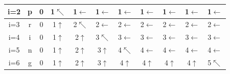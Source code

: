 \documentclass{article}
\begin{document}
\begin{multicols*}{2}
\begin{tabular}{|c|c|c|c|c|c|c|c|c|c|c|}
        i=2                           & p                             & 0                             & \cellcolor{red!25} 1$\nwarrow$ & 1$\leftarrow$
                                      & 1$\leftarrow$                 & 1$\leftarrow$                 &
        1$\leftarrow$                 & 1$\leftarrow$                 &
        1$\leftarrow$                 & 1$\leftarrow$                                                                                                       \\
        \hline
        i=3                           & r                             & 0                             & 1$\uparrow$                    & \cellcolor{red!25}
        2$\nwarrow$                   & 2$\leftarrow$                 & 2$\leftarrow$
                                      & 2$\leftarrow$                 & 2$\leftarrow$                 &
        2$\leftarrow$                 & 2$\leftarrow$                                                                                                       \\
        \hline
        i=4                           & i                             & 0                             & 1$\uparrow$                    & 2$\uparrow$
                                      & \cellcolor{red!25}3$\nwarrow$ & 3$\leftarrow$                 &
        3$\leftarrow$                 & 3$\leftarrow$                 &
        3$\leftarrow$                 & 3$\leftarrow$                                                                                                       \\
        \hline
        i=5                           & n                             & 0                             & 1$\uparrow$                    & 2$\uparrow$
                                      & 3$\uparrow$                   & \cellcolor{red!25}4$\nwarrow$ &
        4$\leftarrow$                 & 4$\leftarrow$                 &
        4$\leftarrow$                 & 4$\leftarrow$                                                                                                       \\
        \hline
        i=6                           & g                             & 0                             & 1$\uparrow$                    & 2$\uparrow$
                                      & 3$\uparrow$                   & 4$\uparrow$                   &
        4$\uparrow$                   & 4$\uparrow$                   & 4$\uparrow$
                                      & 5$\nwarrow$                                                                                                         \\

\end{tabular}
\end{multicols*}
\end{document}
